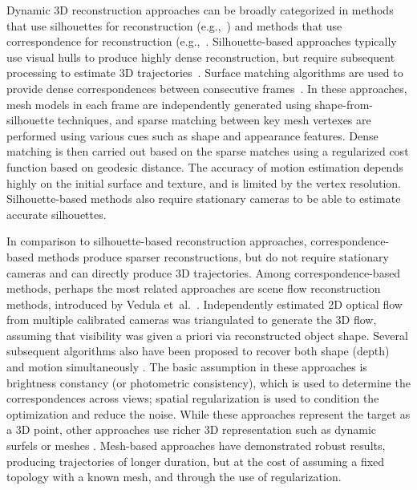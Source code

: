 Dynamic 3D reconstruction approaches can be broadly categorized in methods that use silhouettes for reconstruction (e.g.,~\cite{de2008performance,de2007marker,starck2007surface,Zaharescu2011,Budd2013}) and methods that use correspondence for reconstruction (e.g.,~\cite{Vedula2005,Carceroni2002,Devernay2006}. Silhouette-based approaches typically use visual hulls to produce highly dense reconstruction, but require subsequent processing to estimate 3D trajectories~\cite{de2008performance,starck2007surface}. Surface matching algorithms are used to provide dense correspondences between consecutive frames~\cite{Tung2010,Starck2005,Varanasi2008}. In these approaches, mesh models in each frame are independently generated using shape-from-silhouette techniques, and sparse matching between key mesh vertexes are performed using various cues such as shape and appearance features. Dense matching is then carried out based on the sparse matches using a regularized cost function based on geodesic distance. The accuracy of motion estimation depends highly on the initial surface and texture, and is limited by the vertex resolution. Silhouette-based methods also require stationary cameras to be able to estimate accurate silhouettes.

In comparison to silhouette-based reconstruction approaches, correspondence-based methods produce sparser reconstructions, but do not require stationary cameras and can directly produce 3D trajectories. Among correspondence-based methods, perhaps the most related approaches are scene flow reconstruction methods, introduced by Vedula et~al.~\cite{Vedula2005}. Independently estimated 2D optical flow from multiple calibrated cameras was triangulated to generate the 3D flow, assuming that visibility was given a priori via reconstructed object shape. Several subsequent algorithms also have been proposed to recover both shape (depth) and motion simultaneously \cite{Basha2012a,Vogel2011,Huguet2007}. The basic assumption in these approaches is brightness constancy (or photometric consistency), which is used to determine the correspondences across views; spatial regularization is used to condition the optimization and reduce the noise. While these approaches represent the target as a 3D point, other approaches use richer 3D representation such as dynamic surfels \cite{Carceroni2002,Devernay2006} or meshes \cite{Furukawa-2008}. Mesh-based approaches have demonstrated robust results, producing trajectories of longer duration, but at the cost of assuming a fixed topology with a known mesh, and through the use of regularization.

